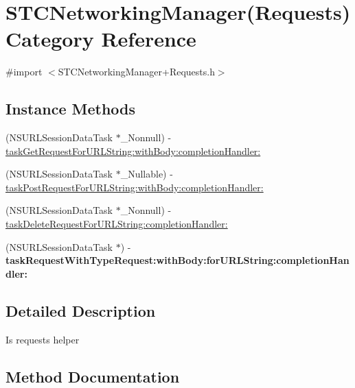 \hypertarget{category_s_t_c_networking_manager_07_requests_08}{}\section{S\+T\+C\+Networking\+Manager(Requests) Category Reference}
\label{category_s_t_c_networking_manager_07_requests_08}


{\ttfamily \#import $<$S\+T\+C\+Networking\+Manager+\+Requests.\+h$>$}

\subsection*{Instance Methods}
\begin{DoxyCompactItemize}
\item 
(N\+S\+U\+R\+L\+Session\+Data\+Task $\ast$\+\_\+\+Nonnull) -\/ \hyperlink{category_s_t_c_networking_manager_07_requests_08_a46b2c22ca530b473fe9b6e4a5cdb5d7f}{task\+Get\+Request\+For\+U\+R\+L\+String\+:with\+Body\+:completion\+Handler\+:}
\item 
(N\+S\+U\+R\+L\+Session\+Data\+Task $\ast$\+\_\+\+Nullable) -\/ \hyperlink{category_s_t_c_networking_manager_07_requests_08_a37c2e90cf13e74182487be0f537a6321}{task\+Post\+Request\+For\+U\+R\+L\+String\+:with\+Body\+:completion\+Handler\+:}
\item 
(N\+S\+U\+R\+L\+Session\+Data\+Task $\ast$\+\_\+\+Nonnull) -\/ \hyperlink{category_s_t_c_networking_manager_07_requests_08_a7cf3e2d4e1f5b8a1414c392b43ee63bd}{task\+Delete\+Request\+For\+U\+R\+L\+String\+:completion\+Handler\+:}
\item 
\hypertarget{category_s_t_c_networking_manager_07_requests_08_a3611a93c8a7d36d4fbbbeb4c70132150}{}\label{category_s_t_c_networking_manager_07_requests_08_a3611a93c8a7d36d4fbbbeb4c70132150} 
(N\+S\+U\+R\+L\+Session\+Data\+Task $\ast$) -\/ {\bfseries task\+Request\+With\+Type\+Request\+:with\+Body\+:for\+U\+R\+L\+String\+:completion\+Handler\+:}
\end{DoxyCompactItemize}


\subsection{Detailed Description}
Is requests helper 

\subsection{Method Documentation}
\hypertarget{category_s_t_c_networking_manager_07_requests_08_a7cf3e2d4e1f5b8a1414c392b43ee63bd}{}\label{category_s_t_c_networking_manager_07_requests_08_a7cf3e2d4e1f5b8a1414c392b43ee63bd} 
